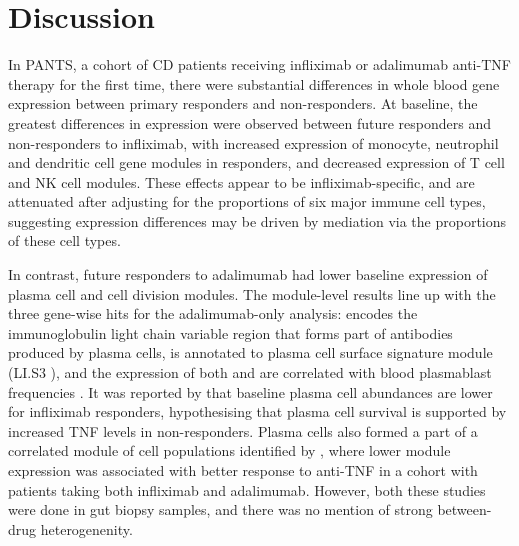 

\section{Discussion}

In \gls{PANTS}, a cohort of \gls{CD} patients receiving infliximab or adalimumab anti-TNF therapy for the first time,
there were substantial differences in whole blood gene expression between primary responders and non-responders.
At baseline, the greatest differences in expression were observed between future responders and non-responders to infliximab,
with increased expression of monocyte, neutrophil and dendritic cell gene modules in responders,
and decreased expression of T cell and NK cell modules.
These effects appear to be infliximab-specific, and are attenuated after adjusting for the proportions of six major immune cell types,
suggesting expression differences may be driven by mediation via the proportions of these cell types.

In contrast, future responders to adalimumab had lower baseline expression of plasma cell and cell division modules.
The module-level results line up with the three gene-wise hits for the adalimumab-only analysis:
 encodes the immunoglobulin light chain variable region that forms part of antibodies produced by plasma cells,
 is annotated to plasma cell surface signature module (LI.S3 \autocite{li2013MolecularSignaturesAntibody}), 
and the expression of both  and  are correlated with blood plasmablast frequencies \autocite{tsang2014GlobalAnalysesHuman}.
It was reported by \textcite{gaujoux2019CellcentredMetaanalysisReveals} that baseline plasma cell abundances are lower for infliximab responders,
hypothesising that plasma cell survival is supported by increased \gls{TNF} levels in non-responders.
Plasma cells also formed a part of a correlated module of cell populations identified by \autocite{martin2019SingleCellAnalysisCrohn},
where lower module expression was associated with better response to anti-\gls{TNF} in a cohort with patients taking both infliximab and adalimumab.
However, both these studies were done in gut biopsy samples, and there was no mention of strong between-drug heterogenenity.

